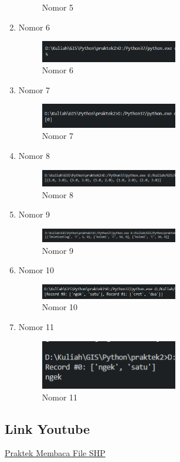 \begin{enumerate}
\begin{figure}[H]
		\centering
		\caption{Nomor 5}
    \end{figure}
    \item Nomor 6
    
    \begin{figure}[H]
		\includegraphics[width=6cm]{figures/1174035/tugas3/soal6_result.png}
		\centering
		\caption{Nomor 6}
    \end{figure}
    \item Nomor 7
    
    \begin{figure}[H]
		\includegraphics[width=6cm]{figures/1174035/tugas3/soal7_result.png}
		\centering
		\caption{Nomor 7}
    \end{figure}
    \item Nomor 8
    
    \begin{figure}[H]
		\includegraphics[width=6cm]{figures/1174035/tugas3/soal8_result.png}
		\centering
		\caption{Nomor 8}
    \end{figure}
    \item Nomor 9
    
    \begin{figure}[H]
		\includegraphics[width=6cm]{figures/1174035/tugas3/soal9_result.png}
		\centering
		\caption{Nomor 9}
    \end{figure}
    \item Nomor 10
    
    \begin{figure}[H]
		\includegraphics[width=6cm]{figures/1174035/tugas3/soal10_result.png}
		\centering
		\caption{Nomor 10}
    \end{figure}
    \item Nomor 11
    
    \begin{figure}[H]
		\includegraphics[width=6cm]{figures/1174035/tugas3/soal11_result.png}
		\centering
		\caption{Nomor 11}
	\end{figure}
\end{enumerate}
\subsection{Link Youtube}
\href{https://youtu.be/xHWkBggoETY}{Praktek Membaca File SHP}
